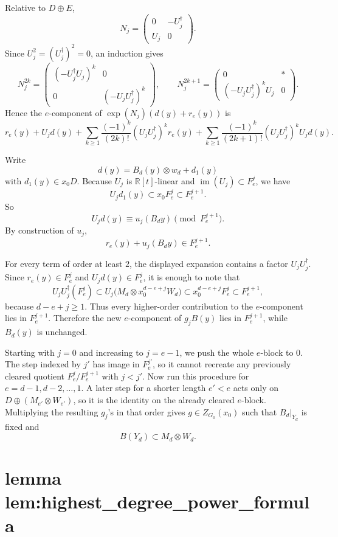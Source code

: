 \documentclass[
]{article}
\begin{document}
Relative to \(D\oplus E\), \[
N_j=
\begin{pmatrix}
0 & -U_j^\dagger\\
U_j & 0
\end{pmatrix}.
\] Since \(U_j^2=(U_j^\dagger)^2=0\), an induction gives \[
N_j^{2k}=
\begin{pmatrix}
(-U_j^\dagger U_j)^k & 0\\
0 & (-U_jU_j^\dagger)^k
\end{pmatrix},
\qquad
N_j^{2k+1}=
\begin{pmatrix}
0 & *\\
(-U_jU_j^\dagger)^kU_j & 0
\end{pmatrix}.
\] Hence the \(e\)-component of \(\exp(N_j)(d(y)+r_e(y))\) is \[
r_e(y)+U_jd(y)
+\sum_{k\ge 1}\frac{(-1)^k}{(2k)!}(U_jU_j^\dagger)^k r_e(y)
+\sum_{k\ge 1}\frac{(-1)^k}{(2k+1)!}(U_jU_j^\dagger)^k U_jd(y).
\]

Write \[
d(y)=B_d(y)\otimes w_d+d_1(y)
\] with \(d_1(y)\in x_0D\). Because \(U_j\) is \(\mathbb R[t]\)-linear
and \(\operatorname{im}(U_j)\subset F_e^j\), we have \[
U_jd_1(y)\subset x_0F_e^j\subset F_e^{j+1}.
\] So \[
U_jd(y)\equiv u_j(B_dy)\pmod{F_e^{j+1}}.
\] By construction of \(u_j\), \[
r_e(y)+u_j(B_dy)\in F_e^{j+1}.
\]

For every term of order at least \(2\), the displayed expansion contains
a factor \(U_jU_j^\dagger\). Since \(r_e(y)\in F_e^j\) and
\(U_jd(y)\in F_e^j\), it is enough to note that \[
U_jU_j^\dagger(F_e^j)\subset U_j\!\bigl(M_d\otimes x_0^{d-e+j}W_d\bigr)
\subset x_0^{d-e+j}F_e^j\subset F_e^{j+1},
\] because \(d-e+j\ge 1\). Thus every higher-order contribution to the
\(e\)-component lies in \(F_e^{j+1}\). Therefore the new \(e\)-component
of \(g_jB(y)\) lies in \(F_e^{j+1}\), while \(B_d(y)\) is unchanged.

Starting with \(j=0\) and increasing to \(j=e-1\), we push the whole
\(e\)-block to \(0\). The step indexed by \(j'\) has image in
\(F_e^{j'}\), so it cannot recreate any previously cleared quotient
\(F_e^j/F_e^{j+1}\) with \(j<j'\). Now run this procedure for
\(e=d-1,d-2,\dots,1\). A later step for a shorter length \(e'<e\) acts
only on \(D\oplus(M_{e'}\otimes W_{e'})\), so it is the identity on the
already cleared \(e\)-block. Multiplying the resulting \(g_j\)'s in that
order gives \(g\in Z_{G_0}(x_0)\) such that \(B_d|_{Y_d}\) is fixed and
\[
B(Y_d)\subset M_d\otimes W_d.
\]

\section{lemma
lem:highest\_degree\_power\_formula}\label{lemma-lemhighest_degree_power_formula}
\end{document}
